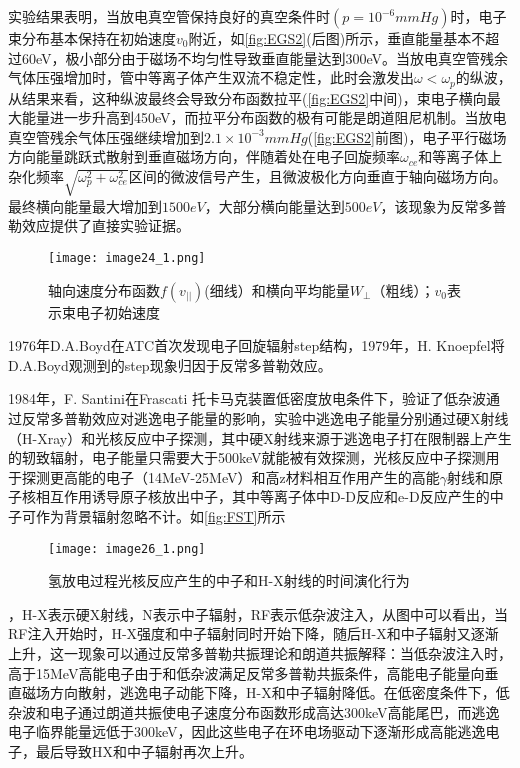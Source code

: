 实验结果表明，当放电真空管保持良好的真空条件时$(p=10^{-6}mm Hg)$时，电子束分布基本保持在初始速度$v_0$附近，如\autoref{fig:EGS2}(后图)所示，垂直能量基本不超过60eV，极小部分由于磁场不均匀性导致垂直能量达到300eV。当放电真空管残余气体压强增加时，管中等离子体产生双流不稳定性，此时会激发出$\omega< \omega_p$的纵波，从结果来看，这种纵波最终会导致分布函数拉平(\autoref{fig:EGS2}中间)，束电子横向最大能量进一步升高到450eV，而拉平分布函数的极有可能是朗道阻尼机制。当放电真空管残余气体压强继续增加到$2.1\times10^{-3}mm Hg$(\autoref{fig:EGS2}前图)，电子平行磁场方向能量跳跃式散射到垂直磁场方向，伴随着处在电子回旋频率$ω_{ce}$和等离子体上杂化频率$\sqrt{ω_p^2+ω_{ce}^2}$区间的微波信号产生，且微波极化方向垂直于轴向磁场方向。最终横向能量最大增加到$1500eV$，大部分横向能量达到$500eV$，该现象为反常多普勒效应提供了直接实验证据。
\begin{figure}[ht]
\centering
\texttt{[image: image24\_1.png]}
\caption{\label{fig:EGS2}轴向速度分布函数$f(v_{||})$(细线）和横向平均能量$W_⊥$（粗线）；$v_0$表示束电子初始速度\cite{RN786}}
\end{figure}
\par
1976年D.A.Boyd在ATC首次发现电子回旋辐射step结构\cite{RN725}，1979年，H. Knoepfel将D.A.Boyd观测到的step现象归因于反常多普勒效应\cite{RN1030}。
\par
1984年，F. Santini在Frascati 托卡马克装置低密度放电条件下，验证了低杂波通过反常多普勒效应对逃逸电子能量的影响\cite{RN1866}，实验中逃逸电子能量分别通过硬X射线（H-Xray）和光核反应中子探测，其中硬X射线来源于逃逸电子打在限制器上产生的轫致辐射，电子能量只需要大于500keV就能被有效探测，光核反应中子探测用于探测更高能的电子（14MeV-25MeV）和高z材料相互作用产生的高能$γ$射线和原子核相互作用诱导原子核放出中子，其中等离子体中D-D反应和e-D反应产生的中子可作为背景辐射忽略不计。如\autoref{fig:FST}所示
\begin{figure}[ht]
\centering
\texttt{[image: image26\_1.png]}
\caption{\label{fig:FST}氢放电过程光核反应产生的中子和H-X射线的时间演化行为\cite{RN1866}}
\end{figure}
，H-X表示硬X射线，N表示中子辐射，RF表示低杂波注入，从图中可以看出，当RF注入开始时，H-X强度和中子辐射同时开始下降，随后H-X和中子辐射又逐渐上升，这一现象可以通过反常多普勒共振理论和朗道共振解释：当低杂波注入时，高于15MeV高能电子由于和低杂波满足反常多普勒共振条件，高能电子能量向垂直磁场方向散射，逃逸电子动能下降，H-X和中子辐射降低。在低密度条件下，低杂波和电子通过朗道共振使电子速度分布函数形成高达300keV高能尾巴，而逃逸电子临界能量远低于300keV，因此这些电子在环电场驱动下逐渐形成高能逃逸电子，最后导致HX和中子辐射再次上升。

